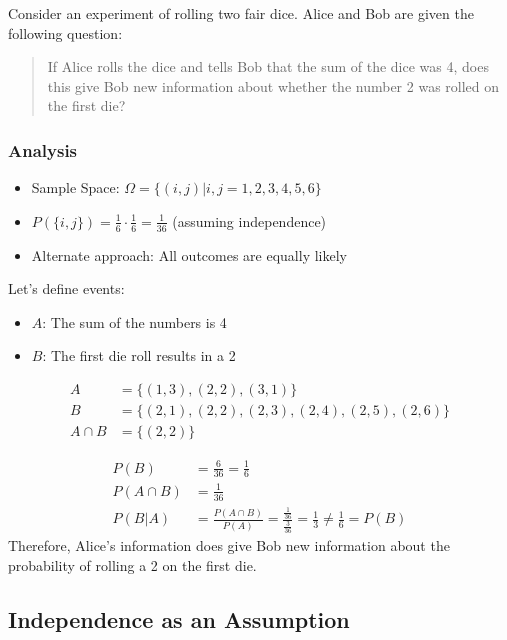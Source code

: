 \documentclass{article}
\begin{document}
    Consider an experiment of rolling two fair dice. Alice and Bob are given the following question:
    
    \begin{quote}
    If Alice rolls the dice and tells Bob that the sum of the dice was 4, does this give Bob new information about whether the number 2 was rolled on the first die?
    \end{quote}
    
    \subsubsection*{Analysis}
    
    \begin{itemize}
        \item Sample Space: $\Omega = \{(i,j) | i,j = 1,2,3,4,5,6\}$
        \item $P(\{i,j\}) = \frac{1}{6} \cdot \frac{1}{6} = \frac{1}{36}$ (assuming independence)
        \item Alternate approach: All outcomes are equally likely
    \end{itemize}
    
    Let's define events:
    \begin{itemize}
        \item $A$: The sum of the numbers is 4
        \item $B$: The first die roll results in a 2
    \end{itemize}
    
    \begin{align*}
        A &= \{(1,3), (2,2), (3,1)\} \\
        B &= \{(2,1), (2,2), (2,3), (2,4), (2,5), (2,6)\} \\
        A \cap B &= \{(2,2)\}
    \end{align*}
    
    \begin{align*}
        P(B) &= \frac{6}{36} = \frac{1}{6} \\
        P(A \cap B) &= \frac{1}{36} \\
        P(B|A) &= \frac{P(A \cap B)}{P(A)} = \frac{\frac{1}{36}}{\frac{3}{36}} = \frac{1}{3} \neq \frac{1}{6} = P(B)
    \end{align*}
    Therefore, Alice's information does give Bob new information about the probability of rolling a 2 on the first die.

    \subsection*{Independence as an Assumption}
\end{document}
